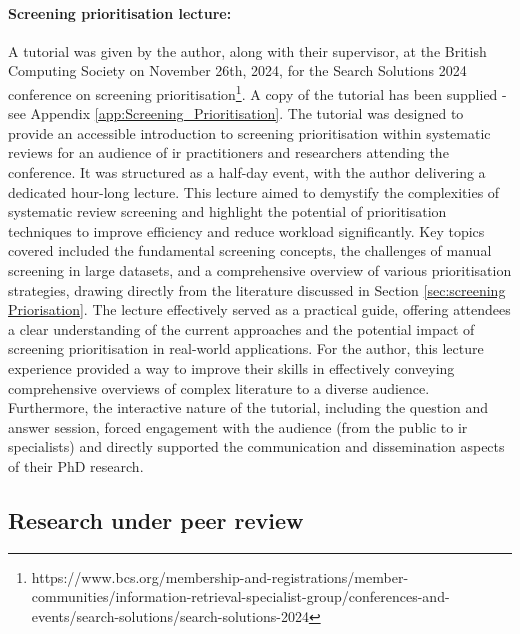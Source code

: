 \documentclass[10pt,oneside]{book}
\begin{document}
\paragraph{Screening prioritisation lecture:}
A tutorial was given by the author, along with their supervisor, at the British Computing Society on November 26th, 2024, for the Search Solutions 2024 conference on screening prioritisation\footnote{https://www.bcs.org/membership-and-registrations/member-communities/information-retrieval-specialist-group/conferences-and-events/search-solutions/search-solutions-2024}. A copy of the tutorial has been supplied - see Appendix \ref{app:Screening_Prioritisation}. The tutorial was designed to provide an accessible introduction to screening prioritisation within systematic reviews for an audience of \gls*{ir} practitioners and researchers attending the conference. It was structured as a half-day event, with the author delivering a dedicated hour-long lecture. This lecture aimed to demystify the complexities of systematic review screening and highlight the potential of prioritisation techniques to improve efficiency and reduce workload significantly. Key topics covered included the fundamental screening concepts, the challenges of manual screening in large datasets, and a comprehensive overview of various prioritisation strategies, drawing directly from the literature discussed in Section \ref{sec:screening Priorisation}. The lecture effectively served as a practical guide, offering attendees a clear understanding of the current approaches and the potential impact of screening prioritisation in real-world applications. For the author, this lecture experience provided a way to improve their skills in effectively conveying comprehensive overviews of complex literature to a diverse audience. Furthermore, the interactive nature of the tutorial, including the question and answer session, forced engagement with the audience (from the public to \gls*{ir} specialists) and directly supported the communication and dissemination aspects of their PhD research.

\subsection{Research under peer review}
\end{document}
